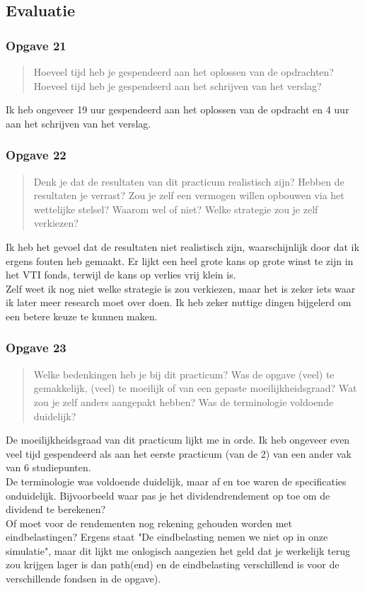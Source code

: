 \documentclass[11pt, a4paper, titlepage, openright]{article}
\begin{document}
	\subsection{Evaluatie}
	
	\subsubsection{Opgave 21}
		\begin{quote}
			Hoeveel tijd heb je gespendeerd aan het oplossen van de opdrachten? 
			Hoeveel tijd heb je gespendeerd aan het schrijven van het verslag?
		\end{quote}
		\noindent Ik heb ongeveer 19 uur gespendeerd aan het oplossen van de opdracht en 4 uur aan het schrijven van het verslag.
	
	\subsubsection{Opgave 22}
		\begin{quote}
			Denk je dat de resultaten van dit practicum realistisch zijn? Hebben de resultaten je verrast? 
			Zou je zelf een vermogen willen opbouwen via het wettelijke stelsel? 
			Waarom wel of niet? Welke strategie zou je zelf verkiezen?
		\end{quote}
		\noindent Ik heb het gevoel dat de resultaten niet realistisch zijn, waarschijnlijk door dat ik ergens fouten heb gemaakt. Er lijkt een heel grote kans op grote winst te zijn in het VTI fonds, terwijl de kans op verlies vrij klein is. \\
		Zelf weet ik nog niet welke strategie is zou verkiezen, maar het is zeker iets waar ik later meer research moet over doen. Ik heb zeker nuttige dingen bijgelerd om een betere keuze te kunnen maken.
		
	
	\subsubsection{Opgave 23}
		\begin{quote}
			Welke bedenkingen heb je bij dit practicum? Was de opgave (veel) te gemakkelijk, (veel) te moeilijk of 
			van een gepaste moeilijkheidsgraad? Wat zou je zelf anders aangepakt hebben?  Was de terminologie voldoende duidelijk?
		\end{quote}
		\noindent De moeilijkheidsgraad van dit practicum lijkt me in orde. Ik heb ongeveer even veel tijd gespendeerd als aan het 
		eerste practicum (van de 2) van een ander vak van 6 studiepunten.\\
		De terminologie was voldoende duidelijk, maar af en toe waren de specificaties onduidelijk.
		Bijvoorbeeld waar pas je het dividendrendement op toe om de dividend te berekenen? \\ Of moet voor de rendementen 
		nog rekening gehouden worden met eindbelastingen? Ergens staat "De eindbelasting nemen we niet op in onze simulatie", 
		maar dit lijkt me onlogisch aangezien het geld dat je werkelijk terug zou krijgen lager is dan path(end) en de 
		eindbelasting verschillend is voor de verschillende fondsen in de opgave). 
		
\end{document}
